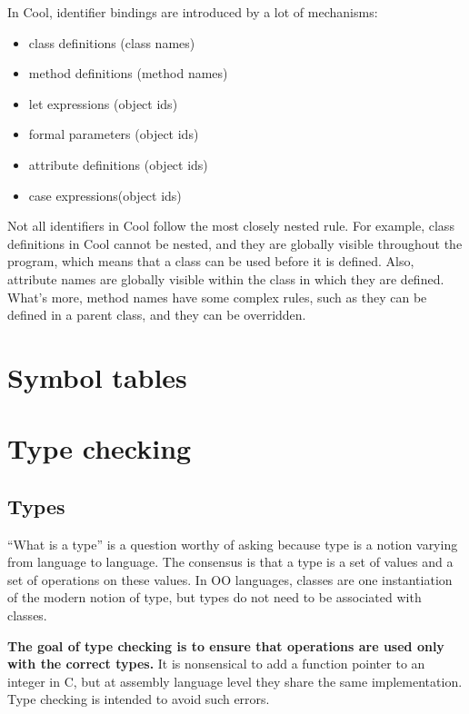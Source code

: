 In Cool, identifier bindings are introduced by a lot of mechanisms:
\begin{itemize}
\item class definitions (class names)
\item method definitions (method names)
\item let expressions (object ids)
\item formal parameters (object ids)
\item attribute definitions (object ids)
\item case expressions(object ids)
\end{itemize}
Not all identifiers in Cool follow the most closely nested rule. For example, class definitions in Cool cannot be nested, and they are globally visible throughout the program, which means that a class can be used before it is defined. Also, attribute names are globally visible within the class in which they are defined. What's more, method names have some complex rules, such as they can be defined in a parent class, and they can be overridden.
\section{Symbol tables}
\section{Type checking}
\subsection{Types}
``What is a type'' is a question worthy of asking because type is a notion varying from language to language. The consensus is that a type is a set of values and a set of operations on these values. In OO languages, classes are one instantiation of the modern notion of type, but types do not need to be associated with classes. 

{\bf The goal of type checking is to ensure that operations are used only with the correct types. }It is nonsensical to add a function pointer to an integer in C, but at assembly language level they share the same implementation. Type checking is intended to avoid such errors.

